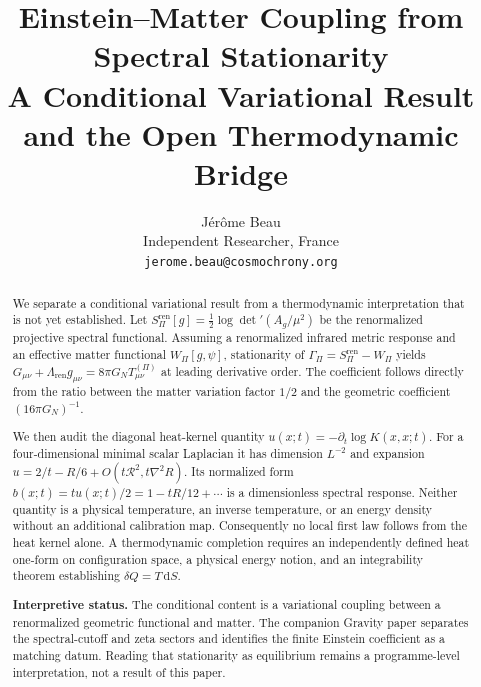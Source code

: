 \documentclass[12pt,a4paper]{article}
\theoremstyle{definition}
\newcommand{\Spi}{S_{\Pi}}
\newcommand{\Ag}{A_g}
\newcommand{\dd}{\mathrm{d}}
\newcommand{\half}{\tfrac{1}{2}}
\begin{document}
  \title{Einstein--Matter Coupling from Spectral Stationarity\\
  \large A Conditional Variational Result and the Open Thermodynamic Bridge}

  \author{J\'{e}r\^{o}me Beau\\
  \small Independent Researcher, France\\
  \small \texttt{jerome.beau@cosmochrony.org}}

  \maketitle

  \begin{abstract}
    We separate a conditional variational result from a thermodynamic interpretation that is not yet established.
    Let $\Spi^{\mathrm{ren}}[g]=\half\log\det'(\Ag/\mu^2)$ be the renormalized projective spectral functional.
    Assuming a renormalized infrared metric response and an effective matter functional $W_\Pi[g,\psi]$,
    stationarity of $\Gamma_\Pi=\Spi^{\mathrm{ren}}-W_\Pi$ yields
    $G_{\mu\nu}+\Lambda_{\mathrm{ren}}g_{\mu\nu}=8\pi G_N T^{(\Pi)}_{\mu\nu}$
    at leading derivative order.
    The coefficient follows directly from the ratio between the matter variation factor $1/2$ and the geometric
    coefficient $(16\pi G_N)^{-1}$.

    We then audit the diagonal heat-kernel quantity
    $u(x;t)=-\partial_t\log K(x,x;t)$.
    For a four-dimensional minimal scalar Laplacian it has dimension $L^{-2}$ and expansion
    $u=2/t-R/6+O(t\mathcal{R}^2,t\nabla^2R)$.
    Its normalized form $b(x;t)=tu(x;t)/2=1-tR/12+\cdots$ is a dimensionless spectral response.
    Neither quantity is a physical temperature, an inverse temperature, or an energy density without an additional
    calibration map.
    Consequently no local first law follows from the heat kernel alone.
    A thermodynamic completion requires an independently defined heat one-form on configuration space, a physical
    energy notion, and an integrability theorem establishing $\delta Q=T\,\dd S$.

    \textbf{Interpretive status.}
    The conditional content is a variational coupling between a renormalized geometric functional and matter.
    The companion Gravity paper separates the spectral-cutoff and zeta sectors and identifies the finite Einstein
    coefficient as a matching datum.
    Reading that stationarity as equilibrium remains a programme-level interpretation, not a result of this paper.
  \end{abstract}
\end{document}
